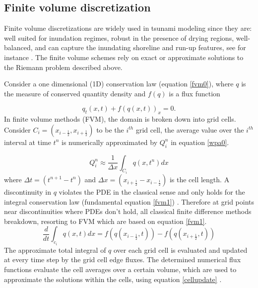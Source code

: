 \documentclass[10pt,a4paper]{article}
\newcommand{\donna}[1]{{\color{red}{#1}}}
\newcommand{\ignore}[1]{}
\begin{document}
	\subsection{Finite volume discretization}
Finite volume discretizations are widely used in tsunami modeling since they are: well suited for inundation regimes, robust in the presence of drying regions, well-balanced, and can capture the inundating shoreline and run-up features, see for instance \citet{ge:2008,ge:2011,george2006finite,be-ge-le-ma:2011,bi2014finite,leveque2002finite,ba-le-mi-ro:2003}. The finite volume schemes rely on exact or approximate solutions to the Riemann problem described above.  

\donna{Probably no need to cite  more references in this general section.}

Consider a one dimensional (1D) conservation law  (equation \eqref{fvm0}),  where $q$ is the measure of conserved quantity density and $f(q)$ is a flux function

	\begin{equation}
		q_{t}(x,t) + f(q(x,t))_{x} = 0.
		\label{fvm0}
	\end{equation}	
	In finite volume methods (FVM), the domain is broken down into grid cells. Consider $C_{i} = (x_{i-\frac{1}{2}},x_{i+\frac{1}{2}})$ to be the $i^{th}$ grid cell, the average value over the $i^{th}$ interval at time $t^{n}$ is numerically approximated by $Q_{i}^{n}$ in equation \eqref{wpa0}.
	
	\begin{equation}
		Q_{i}^{n} \approx \dfrac{1}{\Delta x} \int_{C_{i}}q(x,t^{n})dx
		\label{wpa0}
	\end{equation}
	where $\Delta t = (t^{n+1} - t^{n})$ and  $\Delta x = (x_{i+\frac{1}{2}} - x_{i-\frac{1}{2}})$ is the cell length. A discontinuity in $q$ violates the PDE in the classical sense and only holds for the integral conservation law (fundamental equation \eqref{fvm1}) \ignore{\cite{leveque2002finite}}. Therefore at grid points near discontinuities where PDEs don't hold, all classical finite difference methods breakdown, resorting to FVM which are based on equation \eqref{fvm1}. 	
	\begin{equation}
		\frac{d}{dt} \int_{c_{i}} q(x,t)dx = f(q(x_{i-\frac{1}{2}},t)) -  f(q(x_{i+\frac{1}{2}},t))
		\label{fvm1}
	\end{equation}	
	The approximate  total integral of $q$ over each grid cell is evaluated and updated at every time step by the grid cell edge fluxes. The determined numerical flux functions evaluate the  cell averages over a certain volume, which are used to approximate the solutions within the cells, using equation \eqref{cellupdate} \ignore{\cite{le-ge-be:2011}}.
	
\end{document}
